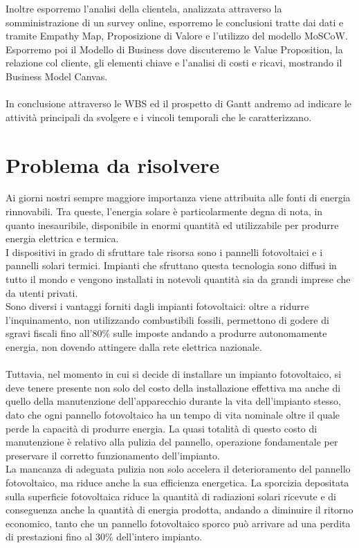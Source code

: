 \documentclass[a4paper, 12pt]{article}
\begin{document}
	Inoltre esporremo l'analisi della clientela, analizzata attraverso la somministrazione di un survey online, esporremo le conclusioni tratte dai dati e tramite Empathy Map, Proposizione di Valore e l'utilizzo del modello MoSCoW.\\
	Esporremo poi il Modello di Business dove discuteremo le Value Proposition, la relazione col cliente, gli elementi chiave e l'analisi di costi e ricavi, mostrando il Business Model Canvas.\\\\
	In conclusione attraverso le WBS ed il prospetto di Gantt andremo ad indicare le attività principali da svolgere e i vincoli temporali che le caratterizzano.
	\newpage
	\section{Problema da risolvere}
	Ai giorni nostri sempre maggiore importanza viene attribuita alle fonti di energia rinnovabili. Tra queste, l'energia solare è particolarmente degna di nota, in quanto inesauribile, disponibile in enormi quantità ed utilizzabile per produrre energia elettrica e termica.\\
	I dispositivi in grado di sfruttare tale risorsa sono i pannelli fotovoltaici e i pannelli solari termici. Impianti che sfruttano questa tecnologia sono diffusi in tutto il mondo e vengono installati in notevoli quantità sia da grandi imprese che da utenti privati.\\
	Sono diversi i vantaggi forniti dagli impianti fotovoltaici: oltre a ridurre l'inquinamento, non utilizzando combustibili fossili, permettono di godere di sgravi fiscali fino all'80\% sulle imposte andando a produrre autonomamente energia, non dovendo attingere dalla rete elettrica nazionale.\\\\
	Tuttavia, nel momento in cui si decide di installare un impianto fotovoltaico, si deve tenere presente non solo del costo della installazione effettiva ma anche di quello della manutenzione dell'apparecchio durante la vita dell'impianto stesso, dato che ogni pannello fotovoltaico ha un tempo di vita nominale oltre il quale perde la capacità di produrre energia. La quasi totalità di questo costo di manutenzione è relativo alla pulizia del pannello, operazione fondamentale per preservare il corretto funzionamento dell'impianto.\\
	La mancanza di adeguata pulizia non solo accelera il deterioramento del pannello fotovoltaico, ma riduce anche la sua efficienza energetica. La sporcizia depositata sulla superficie fotovoltaica riduce la quantità di radiazioni solari ricevute e di conseguenza anche la quantità di energia prodotta, andando a diminuire il ritorno economico, tanto che un pannello fotovoltaico sporco può arrivare ad una perdita di prestazioni fino al 30\% dell'intero impianto. %
\end{document}
